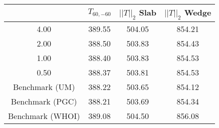 \begin{tabular}{c|ccc}
    & $T_{60,-60}$ & $||T||_2$ Slab & $||T||_2$ Wedge \\
\hline
4.00 & 389.55 & 504.05 & 854.21 \\
2.00 & 388.50 & 503.83 & 854.43 \\
1.00 & 388.40 & 503.83 & 854.53 \\
0.50 & 388.37 & 503.81 & 854.53 \\
\hline
Benchmark (UM) & 388.22 & 503.65 & 854.12 \\
Benchmark (PGC) & 388.21 & 503.69 & 854.34 \\
Benchmark (WHOI) & 389.08 & 504.50 & 856.08 \\
\end{tabular}
